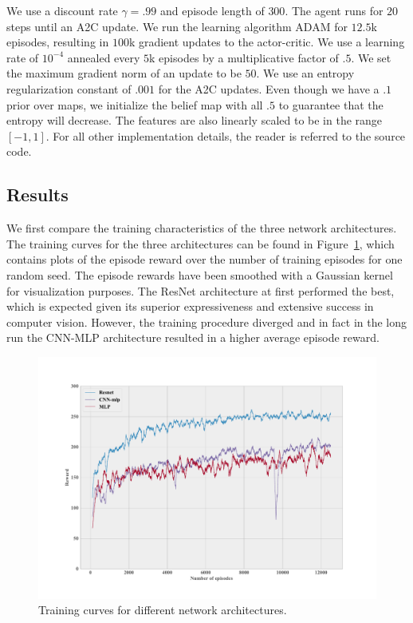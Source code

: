 \documentclass{article}
\begin{document}
We use a discount rate $\gamma=.99$ and episode length of $300$. The agent runs for $20$ steps until an A2C update. We run the learning algorithm ADAM for $12.5$k episodes, resulting in $100$k gradient updates to the actor-critic\cite{kingma2014adam}. We use a learning rate of $10^{-4}$ annealed every $5$k episodes by a multiplicative factor of $.5$. We set the maximum gradient norm of an update to be $50$. We use an entropy regularization constant of $.001$ for the A2C updates. Even though we have a $.1$ prior over maps, we initialize the belief map with all $.5$ to guarantee that the entropy will decrease. The features are also linearly scaled to be in the range $[-1, 1]$. For all other implementation details, the reader is referred to the source code.

\subsection{Results}

We first compare the training characteristics of the three network architectures. The training curves for the three architectures can be found in Figure~\ref{fig:learningcurve}, which contains plots of the episode reward over the number of training episodes for one random seed. The episode rewards have been smoothed with a Gaussian kernel for visualization purposes. The ResNet architecture at first performed the best, which is expected given its superior expressiveness and extensive success in computer vision. However, the training procedure diverged and in fact in the long run the CNN-MLP architecture resulted in a higher average episode reward.

\begin{figure}[h]
    \centering
    \label{fig:learningcurve}
    \caption{Training curves for different network architectures.}
    \includegraphics[scale=.3]{figs/learningcurve.pdf}
\end{figure}
\end{document}
